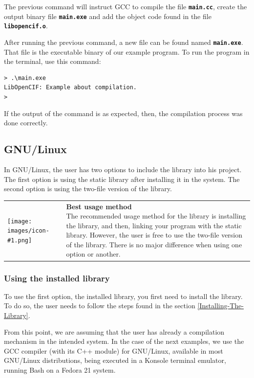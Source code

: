 \documentclass[11pt,twoside,openany,x11names,svgnames]{memoir}
\makeatletter
\newcommand{\IconNote}[3]
{
	\begin{table}[ht]
	\begin{tabular}{ lm{\dimexpr\textwidth-8\tabcolsep-\wd0}@{}}
		\toprule
		\texttt{[image: images/icon-\#1.png]}
		&
		\parbox[t]{155mm}{
		\textbf{#2} \\
		#3
		}
	\end{tabular}
\end{table}
}
\makeatother
\begin{document}
The previous command will instruct GCC to compile the file \textbf{\texttt{main.cc}}, create the output binary file \textbf{\texttt{main.exe}} and add the object code found in the file \textbf{\texttt{libopencif.o}}.

After running the previous command, a new file can be found named \textbf{\texttt{main.exe}}. That file is the executable binary of our example program. To run the program in the terminal, use this command:

\begin{lstlisting}[frame=single,style=SystemCommandStyle]
> .\main.exe
LibOpenCIF: Example about compilation.
>
\end{lstlisting}

If the output of the command is as expected, then, the compilation process was done correctly.

\subsection{GNU/Linux}\label{GNU-Linux}

In GNU/Linux, the user has two options to include the library into his project. The first option is using the static library after installing it in the system. The second option is using the two-file version of the library.

\IconNote
	{info}
	{Best usage method}
	{The recommended usage method for the library is installing the library, and then, linking your program with the static library. However, the user is free to use the two-file version of the library. There is no major difference when using one option or another.}
	
\subsubsection{Using the installed library}\label{Using-the-installed-library}
	
To use the first option, the installed library, you first need to install the library. To do so, the user needs to follow the steps found in the section \ref{Installing-The-Library}.

From this point, we are assuming that the user has already a compilation mechanism in the intended system. In the case of the next examples, we use the GCC compiler (with its C++ module) for GNU/Linux, available in most GNU/Linux distributions, being executed in a Konsole terminal emulator, running Bash on a Fedora 21 system.
\end{document}

